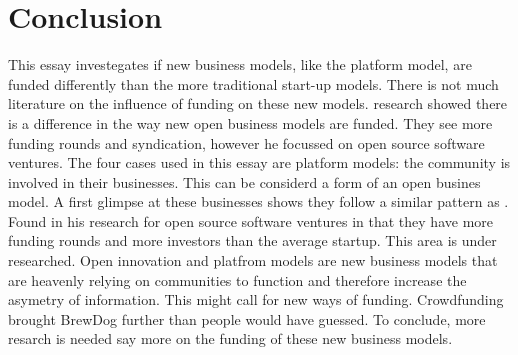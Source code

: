 \documentclass[a4paper, 11pt]{article}
\begin{document}
\section{Conclusion}
This essay investegates if new business models, like the platform model, are funded differently than the more traditional start-up models. There is not much literature on the influence of funding on these new models. \cite{colombo2016open} research showed there is a difference in the way new open business models are funded. They see more funding rounds and syndication, however he focussed on open source software ventures. The four cases used in this essay are platform models: the community is involved in their businesses. This can be considerd a form of an open busines model. A first glimpse at these businesses shows they follow a similar pattern as \cite{colombo2016open}. Found in his research for open source software ventures in that they have more funding rounds and more investors than the average startup.  
This area is under researched. Open innovation and platfrom models are new business models that are heavenly relying on communities to function and therefore increase the asymetry of information. This might call for new ways of funding. Crowdfunding brought BrewDog further than people would have guessed. To conclude, more resarch is needed say more on the funding of these new business models.

\renewcommand{\textbf}{}
\renewcommand{\bf}{}
{}
\end{document}
